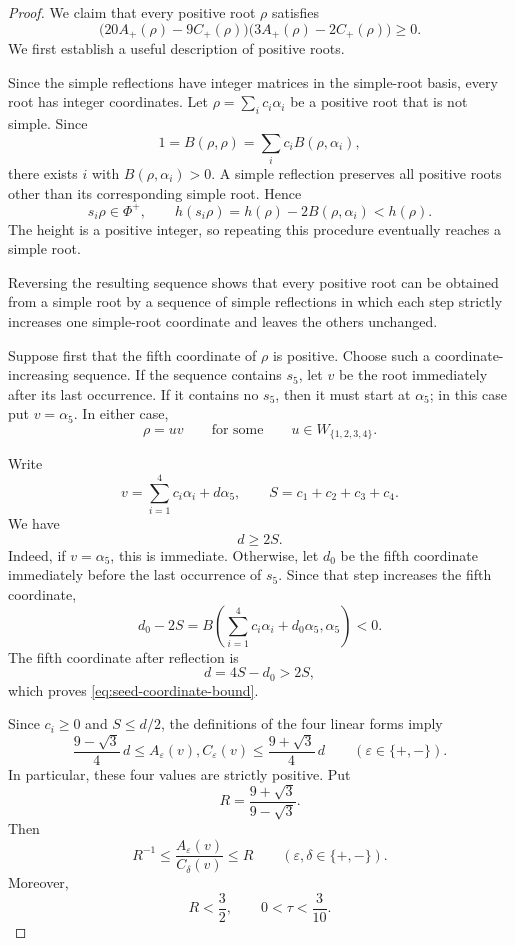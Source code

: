 \documentclass[11pt,reqno]{amsart}
\theoremstyle{plain}
\theoremstyle{definition}
\theoremstyle{remark}
\numberwithin{equation}{section}
\begin{document}
\begin{proof}
We claim that every positive root $\rho$ satisfies
\begin{equation}\label{eq:root-gap-inequality}
\bigl(20A_+(\rho)-9C_+(\rho)\bigr)
\bigl(3A_+(\rho)-2C_+(\rho)\bigr)\geq 0.
\end{equation}
We first establish a useful description of positive roots.

Since the simple reflections have integer matrices in the
simple-root basis, every root has integer coordinates.
Let $\rho=\sum_i c_i\alpha_i$ be a positive root that is
not simple. Since
\[
1=B(\rho,\rho)=\sum_i c_i B(\rho,\alpha_i),
\]
there exists $i$ with $B(\rho,\alpha_i)>0$.
A simple reflection preserves all positive roots other than
its corresponding simple root. Hence
\[
s_i\rho\in\Phi^+,
\qquad
h(s_i\rho)=h(\rho)-2B(\rho,\alpha_i)<h(\rho).
\]
The height is a positive integer, so repeating this procedure
eventually reaches a simple root.

Reversing the resulting sequence shows that every positive
root can be obtained from a simple root by a sequence of
simple reflections in which each step strictly increases
one simple-root coordinate and leaves the others unchanged.

Suppose first that the fifth coordinate of $\rho$ is positive.
Choose such a coordinate-increasing sequence.
If the sequence contains $s_5$, let $v$ be the root immediately
after its last occurrence.
If it contains no $s_5$, then it must start at $\alpha_5$;
in this case put $v=\alpha_5$.
In either case,
\[
\rho=uv
\qquad\text{for some}\qquad
u\in W_{\{1,2,3,4\}}.
\]

Write
\[
v=\sum_{i=1}^{4}c_i\alpha_i+d\alpha_5,
\qquad
S=c_1+c_2+c_3+c_4.
\]
We have
\begin{equation}\label{eq:seed-coordinate-bound}
d\geq 2S.
\end{equation}
Indeed, if $v=\alpha_5$, this is immediate.
Otherwise, let $d_0$ be the fifth coordinate immediately
before the last occurrence of $s_5$.
Since that step increases the fifth coordinate,
\[
d_0-2S
=
B\left(\sum_{i=1}^{4}c_i\alpha_i+d_0\alpha_5,\alpha_5\right)
<0.
\]
The fifth coordinate after reflection is
\[
d=4S-d_0>2S,
\]
which proves \eqref{eq:seed-coordinate-bound}.

Since $c_i\geq 0$ and $S\leq d/2$, the definitions of the
four linear forms imply
\[
\frac{9-\sqrt{3}}{4}\,d
\leq
A_\varepsilon(v),C_\varepsilon(v)
\leq
\frac{9+\sqrt{3}}{4}\,d
\qquad
(\varepsilon\in\{+,-\}).
\]
In particular, these four values are strictly positive.
Put
\[
R=\frac{9+\sqrt{3}}{9-\sqrt{3}}.
\]
Then
\begin{equation}\label{eq:seed-ratio-bound}
R^{-1}
\leq
\frac{A_\varepsilon(v)}{C_\delta(v)}
\leq R
\qquad
(\varepsilon,\delta\in\{+,-\}).
\end{equation}
Moreover,
\begin{equation}\label{eq:elementary-gap-bounds}
R<\frac32,
\qquad
0<\tau<\frac3{10}.
\end{equation}


\end{proof}
\end{document}
